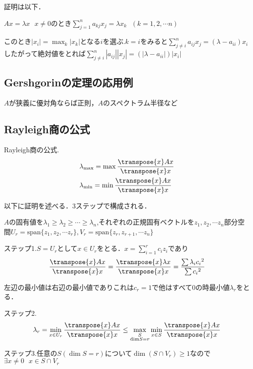 証明は以下．

  $Ax=\lambda x\ \ \ x\neq 0$のとき$\sum_{j=1}^n a_{kj}x_j =\lambda x_k\ \ \ (k=1,2,\cdots n)$

  このとき$|x_i |=\max_{k} |x_k|$となる$i$を選ぶ.$k=i$をみると$\displaystyle\sum_{j\neq i}^n a_{ij}x_j =(\lambda -a_{ii}) x_i $したがって絶対値をとれば$\displaystyle\sum_{j\neq i}^n |a_{ij}| |x_j | =(|\lambda -a_{ii}|) |x_i|$
\subsection{Gershgorinの定理の応用例}
$A$が狭義に優対角ならば正則，$A$のスペクトラム半径など
\subsection{Rayleigh商の公式}
\begin{thm}
  Rayleigh商の公式.
  \begin{align*}
    &{\lambda}_{\max}=\max \displaystyle\frac{\transpose{x}Ax}{\transpose{x}x}\\
    &{\lambda}_{\min}=\min \displaystyle\frac{\transpose{x}Ax}{\transpose{x}x}
  \end{align*}
\end{thm}

以下に証明を述べる．3ステップで構成される．

$A$の固有値を${\lambda}_1 \geq {\lambda}_2 \geq \cdots \geq {\lambda}_n$,それぞれの正規固有ベクトルを$z_1 ,z_2 ,\cdots z_n$部分空間$U_r ={\mathrm{span}}\{ z_1 ,z_2 ,\cdots z_r\},V_r = {\mathrm{span}}\{ z_r ,z_{r+1},\cdots z_n\}$

ステップ1.$S=U_r$として$x\in U_r$をとる．$x=\displaystyle\sum_{i=1}^r c_i z_i$であり
\begin{equation*}
  \displaystyle\frac{\transpose{x}Ax}{\transpose{x}x}=\frac{\transpose{x}\lambda x}{\transpose{x}x}=\frac{\sum {\lambda}_i {c_i}^2}{\sum {c_i}^2}
\end{equation*}

左辺の最小値は右辺の最小値でありこれは$c_r =1$で他はすべて0の時最小値${\lambda}_r$をとる．

ステップ2.
\begin{equation*}
  {\lambda}_r =\min_{x\in U_r}\displaystyle\frac{\transpose{x}Ax}{\transpose{x}x}\leq 
  \max_{\substack{S\\ \text{dim}S=r}}\min_{x\in S}\frac{\transpose{x}Ax}{\transpose{x}x}
\end{equation*}

ステップ3.任意の$S(\dim S=r)$について$\dim (S\cap V_r )\geq 1$なので$\exists x\neq 0\ \ \ x\in S\cap V_r$

